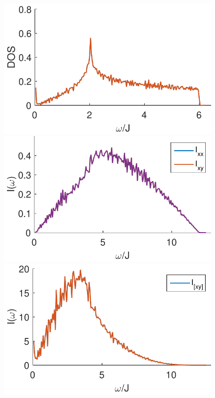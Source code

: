 \documentclass[reprint,amsmath,amssymb,aps,prl,groupedaddress,nofootinbib,superscriptaddress]{revtex4-1}
\newcommand{\1}{\mathds{1}}
\begin{document}

\begin{figure}
	\centering
	\includegraphics[width=0.9\linewidth]{stretch_DOS_rmax_50_b_10_c_0_p_0-eps-converted-to.pdf} 
	\includegraphics[width=0.9\linewidth]{stretch_I2_rmax_50_b_10_c_0_p_0-eps-converted-to.pdf} 
	\includegraphics[width=0.9\linewidth]{stretch_I3_rmax_50_b_10_c_0_p_0-eps-converted-to.pdf}

\end{figure}
\end{document}
